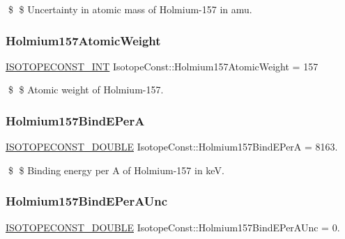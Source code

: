 \$ \$ Uncertainty in atomic mass of Holmium-\/157 in amu. \mbox{\label{group___isotope_const-_holmium-_ho157_gab209120ed0c27b18830f3b794ad258f4}} 
\subsubsection{\texorpdfstring{Holmium157\+Atomic\+Weight}{Holmium157AtomicWeight}}
{\footnotesize\ttfamily \mbox{\hyperlink{group___isotope_const-_macros_ga5f18360b3e99483a35c32d789e62621c}{I\+S\+O\+T\+O\+P\+E\+C\+O\+N\+S\+T\+\_\+\+I\+NT}} Isotope\+Const\+::\+Holmium157\+Atomic\+Weight = 157}

\$ \$ Atomic weight of Holmium-\/157. \mbox{\label{group___isotope_const-_holmium-_ho157_ga115891ef254f377e96527e4f6eb544cd}} 
\subsubsection{\texorpdfstring{Holmium157\+Bind\+E\+PerA}{Holmium157BindEPerA}}
{\footnotesize\ttfamily \mbox{\hyperlink{group___isotope_const-_macros_ga8f45a7272ce02c0b4c65c44636ed719a}{I\+S\+O\+T\+O\+P\+E\+C\+O\+N\+S\+T\+\_\+\+D\+O\+U\+B\+LE}} Isotope\+Const\+::\+Holmium157\+Bind\+E\+PerA = 8163.}

\$ \$ Binding energy per A of Holmium-\/157 in keV. \mbox{\label{group___isotope_const-_holmium-_ho157_gaa7fa0aa209ff776012d6f782441627be}} 
\subsubsection{\texorpdfstring{Holmium157\+Bind\+E\+Per\+A\+Unc}{Holmium157BindEPerAUnc}}
{\footnotesize\ttfamily \mbox{\hyperlink{group___isotope_const-_macros_ga8f45a7272ce02c0b4c65c44636ed719a}{I\+S\+O\+T\+O\+P\+E\+C\+O\+N\+S\+T\+\_\+\+D\+O\+U\+B\+LE}} Isotope\+Const\+::\+Holmium157\+Bind\+E\+Per\+A\+Unc = 0.}

